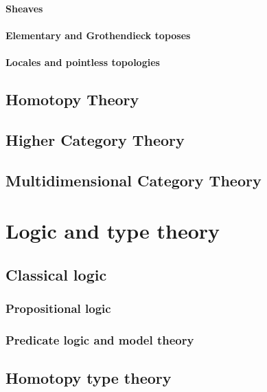 \documentclass[12pt]{report}
\theoremstyle{definition}
\begin{document}
\subsection{Sheaves}

\subsection{Elementary and Grothendieck toposes}

\subsection{Locales and pointless topologies}



\chapter{Homotopy Theory}\label{cha:homotopy-theory}

\chapter{Higher Category Theory}\label{cha:higher-category-theory}

\chapter{Multidimensional Category Theory}\label{cha:mult-categ-theory}



\part{Logic and type theory}\label{part:logic-type-theory}
\chapter{Classical logic}
\section{Propositional logic}
\section{Predicate logic and model theory}

\chapter{Homotopy type theory}

\printindex
\printbibliography%
\end{document}
